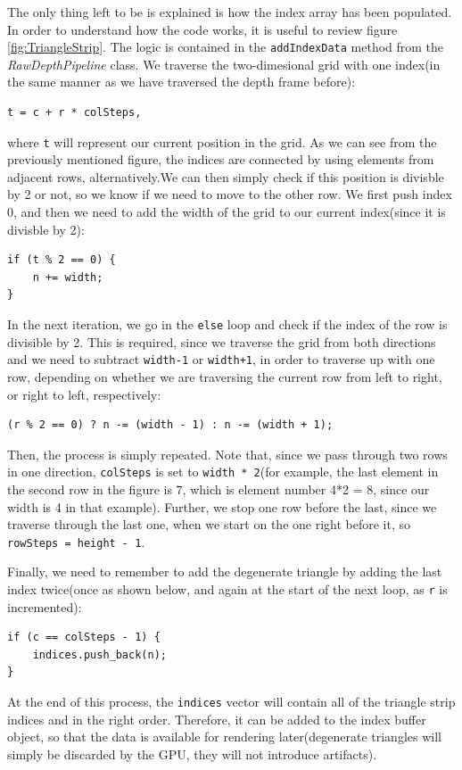 \documentclass[]{article}
\begin{document}
 The only thing left to be is explained is how the index array has been populated. In order to understand how the code works, it is useful to review figure \ref{fig:TriangleStrip}. The logic is contained in the \verb|addIndexData| method from the \textit{RawDepthPipeline} class. We traverse the two-dimesional grid with one index(in the same manner as we have traversed the depth frame before):

 \begin{verbatim}t = c + r * colSteps,\end{verbatim}
 
 where \verb|t| will represent our current position in the grid. As we can see from the previously mentioned figure, the indices are connected by using elements from adjacent rows, alternatively.We can then simply check if this position is divisble by 2 or not, so we know if we need to move to the other row. We first push index 0, and then we need to add the width of the grid to our current index(since it is divisble by 2):
 \begin{verbatim}
if (t % 2 == 0) {
	n += width;
}
 \end{verbatim}
In the next iteration, we go in the \verb|else| loop and check if the index of the row is divisible by 2. This is required, since we traverse the grid from both directions and we need to subtract \verb|width-1| or \verb|width+1|, in order to traverse up with one row, depending on whether we are traversing the current row from left to right, or right to left, respectively:
\begin{verbatim}
(r % 2 == 0) ? n -= (width - 1) : n -= (width + 1);
\end{verbatim}
Then, the process is simply repeated. Note that, since we pass through two rows in one direction, \verb|colSteps| is set to \verb|width * 2|(for example, the last element in the second row in the figure is $7$, which is element number 4*2 = 8, since our width is 4 in that example). Further, we stop one row before the last, since we traverse through the last one, when we start on the one right before it, so \verb|rowSteps = height - 1|.

Finally, we need to remember to add the degenerate triangle by adding the last index twice(once as shown below, and again at the start of the next loop, as \verb|r| is incremented):
\begin{verbatim}
if (c == colSteps - 1) {
	indices.push_back(n);
}
\end{verbatim}

At the end of this process, the \verb|indices| vector will contain all of the triangle strip indices and in the right order. Therefore, it can be added to the index buffer object, so that the data is available for rendering later(degenerate triangles will simply be discarded by the GPU, they will not introduce artifacts).
\end{document}
